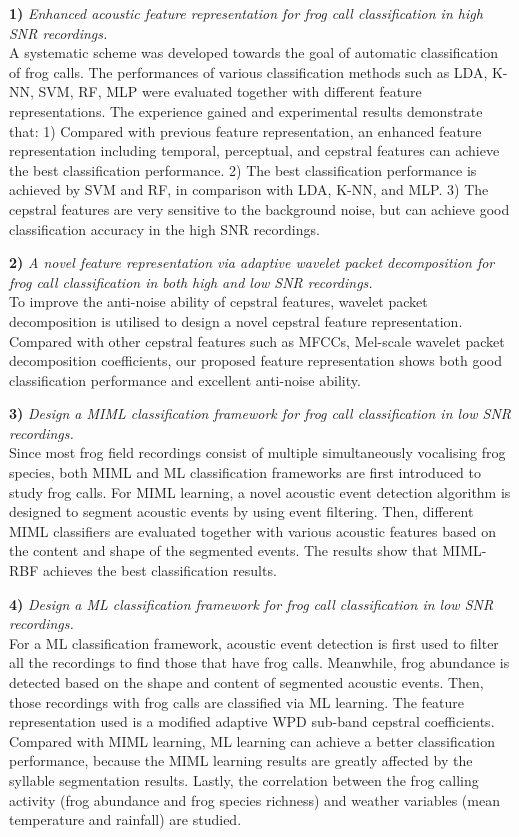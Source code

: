 	
\textbf{1)} \textit{Enhanced acoustic feature representation for frog call classification in high SNR recordings.} 
\\
A systematic scheme was developed towards the goal of automatic classification of frog calls. The performances of various classification methods such as LDA, K-NN, SVM, RF, MLP were evaluated together with different feature representations. The experience gained and experimental results demonstrate that: 1) Compared with previous feature representation, an enhanced feature representation including temporal, perceptual, and cepstral features can achieve the best classification performance. 2) The best classification performance is achieved by SVM and RF, in comparison with LDA, K-NN, and MLP. 3) The cepstral features are very sensitive to the background noise, but can achieve good classification accuracy in the high SNR recordings. 

\textbf{2)} \textit{A novel feature representation via adaptive wavelet packet decomposition for frog call classification in both high and low SNR recordings.}
\\
To improve the anti-noise ability of cepstral features, wavelet packet decomposition is utilised to design a novel cepstral feature representation. Compared with other cepstral features such as MFCCs, Mel-scale wavelet packet decomposition coefficients, our proposed feature representation shows both good classification performance and excellent anti-noise ability. 



\textbf{3)}  \textit{Design a MIML classification framework for frog call classification in low SNR recordings.} 
\\
Since most frog field recordings consist of multiple simultaneously vocalising frog species, both MIML and ML classification frameworks are first introduced to study frog calls. For MIML learning, a novel acoustic event detection algorithm is designed to segment acoustic events by using event filtering. Then, different MIML classifiers are evaluated together with various acoustic features based on the content and shape of the segmented events. The results show that MIML-RBF achieves the best classification results. 


\textbf{4)}  \textit{Design a ML classification framework for frog call classification in low SNR recordings.} 
\\
For a ML classification framework, acoustic event detection is first used to filter all the recordings to find those that have frog calls. Meanwhile, frog abundance is detected based on the shape and content of segmented acoustic events. Then, those recordings with frog calls are classified via ML learning. The feature representation used is a modified adaptive WPD sub-band cepstral coefficients. Compared with MIML learning, ML learning can achieve a better classification performance, because the MIML learning results are greatly affected by the syllable segmentation results. Lastly, the correlation between the frog calling activity (frog abundance and frog species richness) and weather variables (mean temperature and rainfall) are studied.

